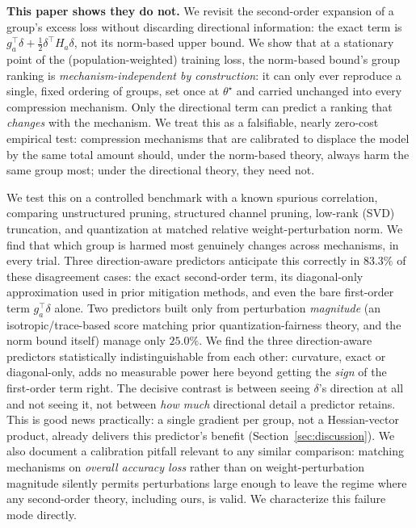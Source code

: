 \documentclass{article}
\newcommand{\theorig}{\theta^\star}
\begin{document}
\textbf{This paper shows they do not.} We revisit the second-order expansion of a group's excess loss without discarding directional information: the exact term is $g_a^\top \delta + \tfrac{1}{2}\delta^\top H_a \delta$, not its norm-based upper bound. We show that at a stationary point of the (population-weighted) training loss, the norm-based bound's group ranking is \emph{mechanism-independent by construction}: it can only ever reproduce a single, fixed ordering of groups, set once at $\theorig$ and carried unchanged into every compression mechanism. Only the directional term can predict a ranking that \emph{changes} with the mechanism. We treat this as a falsifiable, nearly zero-cost empirical test: compression mechanisms that are calibrated to displace the model by the same total amount should, under the norm-based theory, always harm the same group most; under the directional theory, they need not.

We test this on a controlled benchmark with a known spurious correlation, comparing unstructured pruning, structured channel pruning, low-rank (SVD) truncation, and quantization at matched relative weight-perturbation norm. We find that which group is harmed most genuinely changes across mechanisms, in every trial. Three direction-aware predictors anticipate this correctly in $83.3\%$ of these disagreement cases: the exact second-order term, its diagonal-only approximation used in prior mitigation methods, and even the bare first-order term $g_a^\top\delta$ alone. Two predictors built only from perturbation \emph{magnitude} (an isotropic/trace-based score matching prior quantization-fairness theory, and the norm bound itself) manage only $25.0\%$. We find the three direction-aware predictors statistically indistinguishable from each other: curvature, exact or diagonal-only, adds no measurable power here beyond getting the \emph{sign} of the first-order term right. The decisive contrast is between seeing $\delta$'s direction at all and not seeing it, not between \emph{how much} directional detail a predictor retains. This is good news practically: a single gradient per group, not a Hessian-vector product, already delivers this predictor's benefit (Section~\ref{sec:discussion}). We also document a calibration pitfall relevant to any similar comparison: matching mechanisms on \emph{overall accuracy loss} rather than on weight-perturbation magnitude silently permits perturbations large enough to leave the regime where any second-order theory, including ours, is valid. We characterize this failure mode directly.
\end{document}
